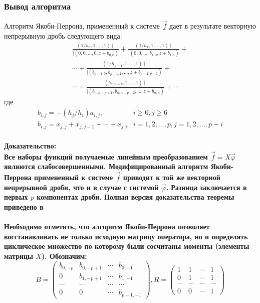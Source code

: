 \subsubsection{Вывод алгоритма}
\begin{teor}
\label{teo_5.1} Алгоритм Якоби-Перрона, примененный к системе
$\overrightarrow{f}$ дает в результате векторную непрерывную дробь
следующего вида:
\begin{eqnarray}
\frac{(1/h_0,1,\ldots,1)\mid}{\mid(0,0,\ldots,0,z+b_{0,0})}+
\frac{(1/h_1,1,\ldots,1)\mid}{\mid(0,0,\ldots,b_{1,0},z+b_{1,1})}+ \nonumber\\
\cdots+\frac{(1/h_{p-1},1,\ldots,1)\mid}{\mid(b_{p-1,0},b_{p-1,1},\ldots,z+b_{p-1,p-1})}+
\nonumber\\
\cdots+\frac{(b_{n,n-p},1,\ldots,1)\mid}{\mid(b_{n,n-p+1},b_{n,n-p+2},\ldots,z+b_{n,n})}+\cdots\nonumber
\end{eqnarray}
где
\begin{equation}
\label{B}
\begin{array}{ll}
b_{i,j}=-(h_j/h_i)a_{i,j}, & i\geq{0},j\geq{6}\\
b_{i,j}=x_{j,j}+x_{j,j-1}+\cdots+x_{j,i} & i=1,2,\ldots,p,j=1,2,\ldots,p-i\\
\end{array}
\end{equation}
\end{teor}
\bf Доказательство: \rm \\
Все наборы функций получаемые линейным преобразованием
$\overrightarrow{f}=X\overrightarrow{\varphi}$ являются
слабосовершенными. Модифицированный алгоритм Якоби-Перрона
примененный к системе $\overrightarrow{f}$ приводит к той же
векторной непрерывной дроби, что и в случае с системой
$\overrightarrow{\varphi}$. Разница заключается в первых $p$
компонентах дроби. Полная версия доказательства теоремы приведено в ~\cite{KaliaguineAA} \\ \\
Необходимо отметить, что алгоритм Якоби-Перрона позволяет
восстанавливать не только исходную матрицу оператора, но и
определять циклическое множество по которому были сосчитаны
моменты (элементы матрицы $X$). Обозначим:
$$%
B=\left(
\begin{array} {cccc}
b_{0,-p} & b_{0,-p+1} & \cdots & b_{0,-1}\\
0        & b_{1,-p+1} & \cdots & b_{1,-1}\\
\cdots   & \cdots     & \cdots & \cdots\\
0        & 0          & \cdots & b_{p-1,-1}
\end{array}
\right), R=\left(
\begin{array}{cccc}
1 & 1 & \cdots & 1\\
0 & 1 & \cdots & 1\\
\cdots & \cdots & \cdots & \cdots\\
0 & 0 & \cdots & 1
\end{array}
\right)
$$%
